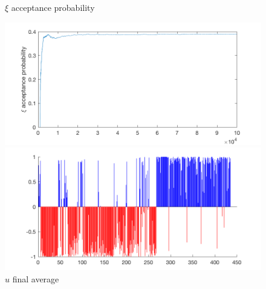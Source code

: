 \documentclass{siamart1116}
\begin{document}
\begin{figure}[!htb]
    \begin{minipage}{0.48\textwidth}
        \centering
        \caption{\label{fig:hier_sim_5} $\xi$ acceptance probability}
        \includegraphics[width=\linewidth]{graphics/noncentered/acceptance_xi_probability.png}
    \end{minipage} \hfill
    \begin{minipage}{0.48\textwidth}
        \centering
        \caption{\label{fig:hier_sim_6} $u$ final average}
        \includegraphics[width=\linewidth]{graphics/noncentered/final_avg.png}
    \end{minipage}
\end{figure}
\end{document}
